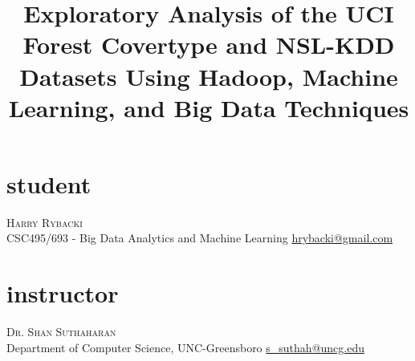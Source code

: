 \documentclass[twoside]{article}
\title{\vspace{-15mm}\fontsize{24pt}{10pt}\selectfont\textbf{Exploratory Analysis of the UCI Forest Covertype and NSL-KDD Datasets Using Hadoop, Machine Learning, and Big Data Techniques}} %
\begin{document}
\maketitle %

\thispagestyle{fancy} %





\begin{multicols}{2} %


\section*{student}
\textsc{Harry Rybacki}\\[2mm]
CSC495/693 - Big Data Analytics and Machine Learning 
\newline \href{mailto:hrybacki@gmail.com}{hrybacki@gmail.com}

\section*{instructor}
\textsc{Dr. Shan Suthaharan}\\[2mm]
Department of Computer Science, UNC-Greensboro
\newline \href{mailto:s\_suthah@uncg.edu}{s\_suthah@uncg.edu}

\end{multicols}

\end{document}
